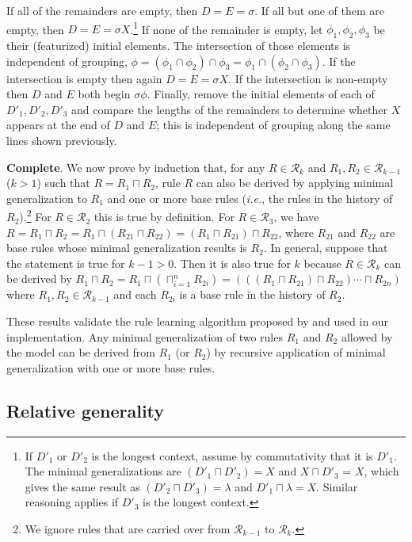\documentclass[11pt]{article}
\begin{document}
If all of the remainders are empty, then $D = E = \sigma$. If all but one of them are empty, then $D = E = \sigma X$.\footnote{If $D'_1$ or $D'_2$ is the longest context, assume by commutativity that it is $D'_1$. The minimal generalizations are $(D'_1 \sqcap D'_2) = X$ and $X \sqcap D'_3$ = $X$, which gives the same result as $(D'_2 \sqcap D'_3) = \lambda$ and $D'_1 \sqcap \lambda = X$. Similar reasoning applies if $D'_3$ is the longest context.} If none of the remainder is empty, let $\phi_1, \phi_2, \phi_3$ be their (featurized) initial elements. The intersection of those elements is independent of grouping, $\phi = (\phi_1 \cap \phi_2) \cap \phi_3 = \phi_1 \cap (\phi_2 \cap \phi_3)$. If the intersection is empty then again $D = E = \sigma X$. If the intersection is non-empty then $D$ and $E$ both begin $\sigma\phi$. Finally, remove the initial elements of each of $D'_1, D'_2, D'_3$ and compare the lengths of the remainders to determine whether $X$ appears at the end of $D$ and $E$; this is independent of grouping along the same lines shown previously.

\textbf{Complete}. \qquad We now prove by induction that, for any $R \in \mathcal{R}_k$ and $R_1, R_2 \in \mathcal{R}_{k-1}$ ($k > 1$) such that $R = R_1 \sqcap R_2$, rule $R$ can also be derived by applying minimal generalization to $R_1$ and one or more base rules (\emph{i.e.}, the rules in the history of $R_2$).\footnote{We ignore rules that are carried over from $\mathcal{R}_{k-1}$ to $\mathcal{R}_{k}$.} For $R \in \mathcal{R}_2$ this is true by definition. For $R \in \mathcal{R}_3$, we have $R = R_1 \sqcap R_2 = R_1 \sqcap (R_{21} \sqcap R_{22}) = (R_1 \sqcap R_{21}) \sqcap R_{22}$, where $R_{21}$ and $R_{22}$ are base rules whose minimal generalization results is $R_2$. In general, suppose that the statement is true for $k-1 > 0$. Then it is also true for $k$ because $R \in \mathcal{R}_k$ can be derived by $R_1 \sqcap R_2 = R_1 \sqcap (\sqcap_{i=1}^{n} R_{2i}) = (((R_{1} \sqcap R_{21}) \sqcap R_{22}) \cdots \sqcap R_{2n})$ where $R_1, R_2 \in \mathcal{R}_{k-1}$ and each $R_{2i}$ is a base rule in the history of $R_2$.

These results validate the rule learning algorithm proposed by \citet{albright-hayes-2002-modeling} and used in our implementation. Any minimal generalization of two rules $R_1$ and $R_2$ allowed by the model can be derived from $R_1$ (or $R_2$) by recursive application of minimal generalization with one or more base rules.


\subsection{Relative generality}
\label{subsec:generality}
\end{document}
